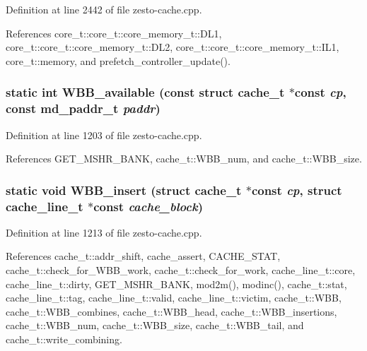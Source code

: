 Definition at line 2442 of file zesto-cache.cpp.

References core\_\-t::core\_\-t::core\_\-memory\_\-t::DL1, core\_\-t::core\_\-t::core\_\-memory\_\-t::DL2, core\_\-t::core\_\-t::core\_\-memory\_\-t::IL1, core\_\-t::memory, and prefetch\_\-controller\_\-update().
\subsubsection[{WBB\_\-available}]{\setlength{\rightskip}{0pt plus 5cm}static int WBB\_\-available (const struct {\bf cache\_\-t} $\ast$const  {\em cp}, \/  const {\bf md\_\-paddr\_\-t} {\em paddr})\hspace{0.3cm}{\tt  [inline, static]}}\label{zesto-cache_8cpp_48f8188c331e3c2188868d0f1c577d5a}




Definition at line 1203 of file zesto-cache.cpp.

References GET\_\-MSHR\_\-BANK, cache\_\-t::WBB\_\-num, and cache\_\-t::WBB\_\-size.
\subsubsection[{WBB\_\-insert}]{\setlength{\rightskip}{0pt plus 5cm}static void WBB\_\-insert (struct {\bf cache\_\-t} $\ast$const  {\em cp}, \/  struct {\bf cache\_\-line\_\-t} $\ast$const  {\em cache\_\-block})\hspace{0.3cm}{\tt  [static]}}\label{zesto-cache_8cpp_54a68443796a201ceb5456ce0fc69bc4}




Definition at line 1213 of file zesto-cache.cpp.

References cache\_\-t::addr\_\-shift, cache\_\-assert, CACHE\_\-STAT, cache\_\-t::check\_\-for\_\-WBB\_\-work, cache\_\-t::check\_\-for\_\-work, cache\_\-line\_\-t::core, cache\_\-line\_\-t::dirty, GET\_\-MSHR\_\-BANK, mod2m(), modinc(), cache\_\-t::stat, cache\_\-line\_\-t::tag, cache\_\-line\_\-t::valid, cache\_\-line\_\-t::victim, cache\_\-t::WBB, cache\_\-t::WBB\_\-combines, cache\_\-t::WBB\_\-head, cache\_\-t::WBB\_\-insertions, cache\_\-t::WBB\_\-num, cache\_\-t::WBB\_\-size, cache\_\-t::WBB\_\-tail, and cache\_\-t::write\_\-combining.
